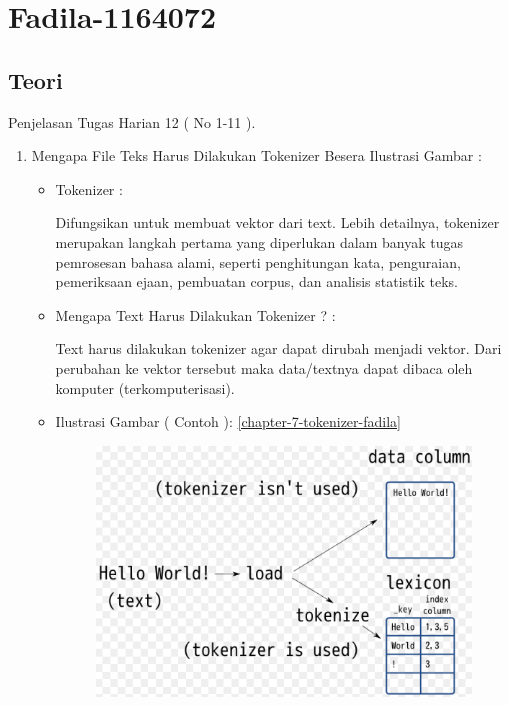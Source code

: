 \begin{enumerate}
\begin{itemize}
\end{itemize}
\par

\end{enumerate}








\section{Fadila-1164072}
\subsection{Teori}
Penjelasan Tugas Harian 12 ( No 1-11 ).
\begin{enumerate}
\item Mengapa File Teks Harus Dilakukan Tokenizer Besera Ilustrasi Gambar :
\begin{itemize}
\item Tokenizer :
\par Difungsikan untuk membuat vektor dari text. Lebih detailnya, tokenizer merupakan langkah pertama yang diperlukan dalam banyak tugas pemrosesan bahasa alami, seperti penghitungan kata, penguraian, pemeriksaan ejaan, pembuatan corpus, dan analisis statistik teks.
\par
\par
\item Mengapa Text Harus Dilakukan Tokenizer ? :
\par Text harus dilakukan tokenizer agar dapat dirubah menjadi vektor. Dari perubahan ke vektor tersebut maka data/textnya dapat dibaca oleh komputer (terkomputerisasi).
\par
\par
\item Ilustrasi Gambar ( Contoh ): \ref{chapter-7-tokenizer-fadila}
\par
\begin{figure}[!hbtp]
\centering
\includegraphics[scale=0.2]{figures/chapter-7-tokenizer-fadila.png}

\end{figure}
\end{itemize}
\end{enumerate}
